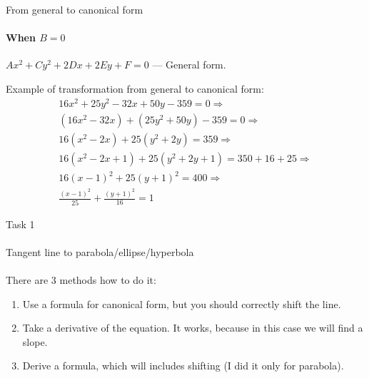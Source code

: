 \documentclass[aspectratio=169]{beamer}
\begin{document}
\begin{frame}[t]{From general to canonical form}
\framesubtitle{When $B=0$}
    $Ax^2 +Cy^2 +2Dx + 2Ey +F = 0$ --- General form. \medskip

    Example of transformation from general to canonical form:
    \begin{align*}
        16x^2 + 25y^2 - 32x + 50y -359 = 0 \Rightarrow \\
        (16x^2 - 32x) + (25y^2 +50y) -359 = 0 \Rightarrow \\ 
        16(x^2 - 2x) + 25(y^2 + 2y) = 359 \Rightarrow \\ 
        16(x^2 -2x +1) + 25(y^2 +2y +1) = 350 + 16 + 25 \Rightarrow \\
        16(x-1)^2 +25(y+1)^2 = 400 \Rightarrow \\ 
        \frac{(x-1)^2}{25}+\frac{(y+1)^2}{16}=1
    \end{align*}
\end{frame}

\begin{frame}[t]{Task 1}
    \framesubtitle{}
\end{frame}

\begin{frame}[t]{Tangent line to parabola/ellipse/hyperbola}
\framesubtitle{}
    There are 3 methods how to do it:
    \begin{enumerate}
        \item Use a formula for canonical form, but you should correctly shift the line.
        \item Take a derivative of the equation. It works, because in this case we will find a slope.
        \item Derive a formula, which will includes shifting (I did it only for parabola).
    \end{enumerate}
\end{frame}
\end{document}
